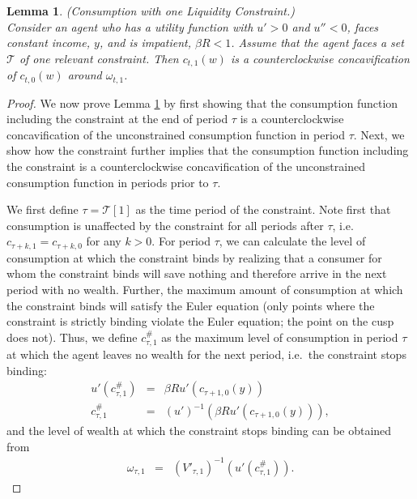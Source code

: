 \documentclass[titlepage]{\econtex}
\providecommand{\wAlt}{\omega}
\newtheorem{lemma}{Lemma}
\begin{document}
  \begin{lemma}\label{lem:pfclc}(Consumption with one Liquidity Constraint.) \\
    Consider an agent who has a utility function with $u'> 0 $ and $u'' < 0$, faces constant income, ${y}$, and is impatient, $\beta R < 1$. Assume that the agent faces a set $\mathcal{T}$ of one relevant constraint. Then $c_{t,1}(w)$ is a counterclockwise concavification of $c_{t,0}(w)$ around $\wAlt_{t,1}$.
  \end{lemma}
  
  
  \begin{proof}
    We now prove Lemma \ref{lem:pfclc} by first showing that the consumption function including the constraint at the end of period $\tau$ is a counterclockwise concavification of the unconstrained consumption function in period $\tau$. Next, we show how the constraint further implies that the consumption function including the constraint is a counterclockwise concavification of the unconstrained consumption function in periods prior to $\tau$. 
    
    We first define $\tau = \mathcal{T}[1]$ as the time period of the constraint. Note first that consumption is unaffected by the constraint for all periods after $\tau$, i.e. $c_{\tau+k,1}=c_{\tau+k,0}$ for any $k > 0$. For period $\tau$, we can calculate the level of consumption at which the constraint binds by realizing that a consumer for whom the constraint binds will save nothing and therefore arrive in the next period with no wealth. Further, the maximum amount of consumption at which the constraint binds will satisfy the Euler equation (only points where the constraint is strictly binding violate the Euler equation; the point on the cusp does not). Thus, we define $c_{\tau,1}^{\#}$ as the maximum level of consumption in period $\tau$ at which the agent leaves no wealth for the next period, i.e.\ the constraint stops binding:
    \begin{eqnarray*}
      \label{eq:ctau1}
      u'(c_{\tau,1}^{\#})   & = & \beta R u'(c_{\tau+1,0}({y}))
      \\   c_{\tau,1}^{\#}       & = & (u')^{-1}\left(\beta R u'(c_{\tau+1,0}({y}))\right),
    \end{eqnarray*}
    and the level of wealth at which the constraint stops binding can be obtained from
    \begin{eqnarray}
      \label{eq:omegaFromc}
      \wAlt_{\tau,1} & = & \left(V'_{\tau,1}\right)^{-1}(u'(c_{\tau,1}^{\#}))  .
    \end{eqnarray}
    

\end{proof}
\end{document}
